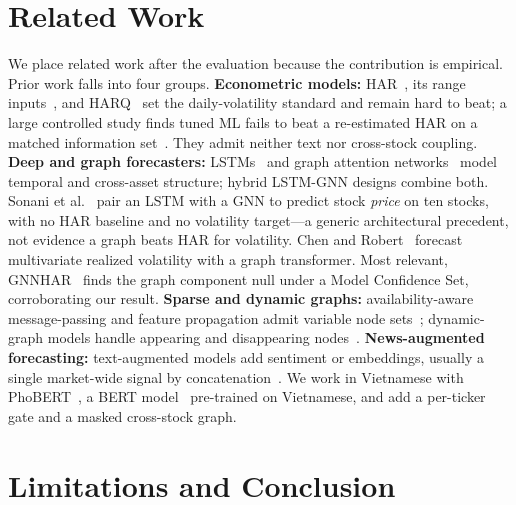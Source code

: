 \documentclass[runningheads]{llncs}
\begin{document}
\section{Related Work}
\label{sec:related}
We place related work after the evaluation because the contribution is empirical. Prior work falls into
four groups. \textbf{Econometric models:} HAR~\cite{corsi2009}, its range inputs~\cite{parkinson1980}, and
HARQ~\cite{bpq2016} set the daily-volatility standard and remain hard to beat; a large controlled study
finds tuned ML fails to beat a re-estimated HAR on a matched information set~\cite{audrino2025}. They admit
neither text nor cross-stock coupling. \textbf{Deep and graph forecasters:} LSTMs~\cite{hochreiter1997} and
graph attention networks~\cite{velickovic2018} model temporal and cross-asset structure; hybrid LSTM-GNN
designs combine both. Sonani et al.~\cite{sonani2025} pair an LSTM with a GNN to predict stock \emph{price}
on ten stocks, with no HAR baseline and no volatility target---a generic architectural precedent, not
evidence a graph beats HAR for volatility. Chen and Robert~\cite{chen2022} forecast multivariate realized
volatility with a graph transformer. Most relevant, GNNHAR~\cite{zhang2025gnnhar} finds the graph component
null under a Model Confidence Set, corroborating our result. \textbf{Sparse and dynamic graphs:}
availability-aware message-passing and feature propagation admit variable node sets~\cite{rossi2022};
dynamic-graph models handle appearing and disappearing nodes~\cite{evolvegcn}. \textbf{News-augmented
forecasting:} text-augmented models add sentiment or embeddings, usually a single market-wide signal by
concatenation~\cite{ouyang2021,das2024}. We work in Vietnamese with PhoBERT~\cite{phobert2020}, a BERT
model~\cite{devlin2019} pre-trained on Vietnamese, and add a per-ticker gate and a masked cross-stock
graph.

\section{Limitations and Conclusion}
\label{sec:conclusion}
\end{document}
